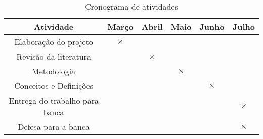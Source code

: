 \begin{table}[htbp]
  \centering
  \caption{Cronograma de atividades}
  \label{tab:cronograma}
  \begin{tabular}{|c|c|c|c|c|c|}
    \hline
    \textbf{Atividade} & \textbf{Março} & \textbf{Abril} & \textbf{Maio} & \textbf{Junho} & \textbf{Julho} \\
    \hline
    Elaboração do projeto & \(\times\) & & & & \\
    \hline
    Revisão da literatura & & \(\times\) & & & \\
    \hline
    Metodologia & & & \(\times\) & & \\
    \hline
    Conceitos e Definições & & & & \(\times\) & \\
    \hline
    Entrega do trabalho para banca & & & & & \(\times\) \\
    \hline
    Defesa para a banca & & & & & \(\times\) \\
    \hline
  \end{tabular}
\end{table}